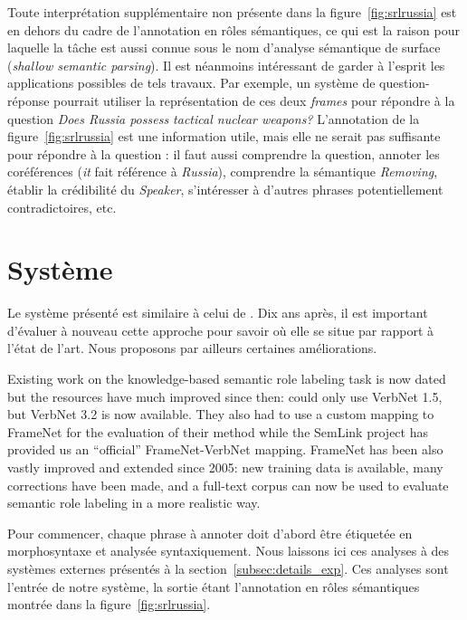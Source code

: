 Toute interprétation supplémentaire non présente dans la
figure~\ref{fig:srlrussia} est en dehors du cadre de l'annotation en rôles
sémantiques, ce qui est la raison pour laquelle la tâche est aussi connue sous
le nom d'analyse sémantique de surface (\emph{shallow semantic parsing}).  Il
est néanmoins intéressant de garder à l'esprit les applications possibles de
tels travaux. Par exemple, un système de question-réponse pourrait utiliser la
représentation de ces deux \emph{frames} pour répondre à la question \emph{Does
Russia possess tactical nuclear weapons?} L'annotation de la
figure~\ref{fig:srlrussia} est une information utile, mais elle ne serait pas
suffisante pour répondre à la question : il faut aussi comprendre la question,
annoter les coréférences (\emph{it} fait référence à \emph{Russia}), comprendre
la sémantique \emph{Removing}, établir la crédibilité du \emph{Speaker},
s'intéresser à d'autres phrases potentiellement contradictoires, etc.

\section{Système}

Le système présenté est similaire à celui de
\cite{swier2004unsupervised,swier2005exploiting}. Dix ans après, il est
important d'évaluer à nouveau cette approche pour savoir où elle se situe par
rapport à l'état de l'art. Nous proposons par ailleurs certaines améliorations.

Existing work on the knowledge-based semantic role labeling task is now dated
but the resources have much improved since then: \citep{swier2005exploiting}
could only use VerbNet 1.5, but VerbNet 3.2 is now available. They also had to
use a custom mapping to FrameNet for the evaluation of their method while the
SemLink project has provided us an ``official'' FrameNet-VerbNet mapping.
FrameNet has been also vastly improved and extended since 2005: new training
data is available, many corrections have been made, and a full-text corpus can
now be used to evaluate semantic role labeling in a more realistic way.



Pour commencer, chaque phrase à annoter doit d'abord être étiquetée en
morphosyntaxe et analysée syntaxiquement. Nous laissons ici ces analyses à des
systèmes externes présentés à la section~\ref{subsec:details_exp}. Ces analyses
sont l'entrée de notre système, la sortie étant l'annotation en rôles
sémantiques montrée dans la figure~\ref{fig:srlrussia}.

